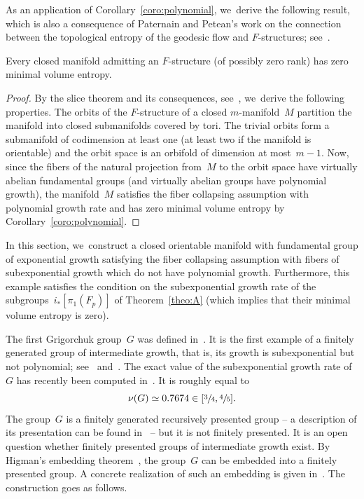 As an application of Corollary~\ref{coro:polynomial}, we~derive the following result, which is also a consequence of Paternain and Petean's work on the connection between the topological entropy of the geodesic flow and $F$-structures; see~\cite[Th.\,A]{PP03}.

\begin{corollary}
Every closed manifold admitting an $F$-structure (of possibly zero rank) has zero minimal volume entropy.
\end{corollary}

\begin{proof}
By the slice theorem and its consequences, see~\cite[App.\,B]{GGK}, we~derive the following properties.
The orbits of the $F$-structure of a closed $m$\nobreakdash-manifold~$M$ partition the manifold into closed submanifolds covered by tori. The trivial orbits form a submanifold of codimension at least one (at least two if the manifold is orientable) and the orbit space is an orbifold of dimension at most~$m-1$.
Now, since the fibers of the natural projection from~$M$ to the orbit space have virtually abelian fundamental groups (and virtually abelian groups have polynomial growth), the manifold~$M$ satisfies the fiber collapsing assumption with polynomial growth rate and has zero minimal volume entropy by Corollary~\ref{coro:polynomial}.
\end{proof}

 \label{sec:ex}

In this section, we~construct a closed orientable manifold with fundamental group of exponential growth satisfying the fiber collapsing assumption with fibers of subexponential growth which do not have polynomial growth.
Furthermore, this example satisfies the condition on the subexponential growth rate of the subgroups~$i_*[\pi_1(F_p)]$ of Theorem~\ref{theo:A} (which implies that their minimal volume entropy is zero).

The first Grigorchuk group~$G$ was defined in~\cite{grigorchuk1}.
It is the first example of a finitely generated group of intermediate growth, that is, its growth is subexponential but not polynomial; see~\cite{grigorchuk} and~\cite{grigorchuk2}.
The exact value of the subexponential growth rate of~$G$ has recently been computed in~\cite{EZ20}.
It is roughly equal to
\[
\nu(G) \simeq 0.7674 \in [\sfrac{3}{4},\sfrac{4}{5}].
\]
The group~$G$ is a finitely generated recursively presented group -- a description of its presentation can be found in~\cite{lys} -- but it is not finitely presented.
It is an open question whether finitely presented groups of intermediate growth exist.
By Higman's embedding theorem~\cite{hig61}, the group~$G$ can be embedded into a finitely presented group.
A concrete realization of such an embedding is given in~\cite[Th.\,1]{grigorchuk2}.
The construction goes as follows.

